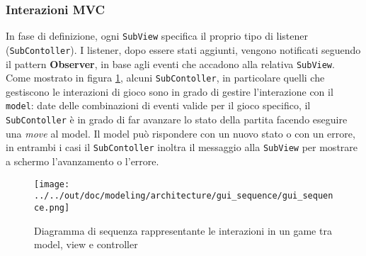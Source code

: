 \subsubsection{Interazioni MVC}
In fase di definizione, ogni \texttt{SubView} specifica il proprio tipo di listener (\texttt{SubContoller}).
%
I listener, dopo essere stati aggiunti, vengono notificati seguendo il pattern \textbf{Observer}, in base agli eventi che accadono alla relativa \texttt{SubView}.
Come mostrato in figura \ref{fig:gui_sequence}, alcuni \texttt{SubContoller}, in particolare quelli che gestiscono le interazioni di gioco sono in grado di gestire l'interazione con il \texttt{model}: date delle combinazioni di eventi valide per il gioco specifico, il \texttt{SubContoller} è in grado di far avanzare lo stato della partita facendo eseguire una \textit{move} al model.
%
Il model può rispondere con un nuovo stato o con un errore, in entrambi i casi il \texttt{SubContoller} inoltra il messaggio alla \texttt{SubView} per mostrare a schermo l'avanzamento o l'errore.
\begin{figure}
  \centering
  \texttt{[image: ../../out/doc/modeling/architecture/gui\_sequence/gui\_sequence.png]}
  \caption{Diagramma di sequenza rappresentante le interazioni in un game tra model, view e controller}
  \label{fig:gui_sequence}
\end{figure}